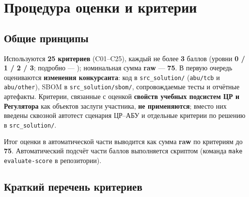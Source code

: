 \chapter{Процедура оценки и критерии}
\label{ch:evaluation}

\section{Общие принципы}

Используются \textbf{25 критериев} (C01--C25), каждый не более \textbf{3} баллов (уровни \textbf{0 / 1 / 2 / 3}; подробно --- ); номинальная сумма \textbf{raw} --- \textbf{75}. В первую очередь оцениваются \textbf{изменения конкурсанта}: код в \texttt{src\_solution/} (\texttt{abu/tcb} и \texttt{abu/other}), SBOM в \texttt{src\_solution/sbom/}, сопровождаемые тесты и отчётные артефакты. Критерии, связанные с оценкой \textbf{свойств учебных подсистем ЦР и Регулятора} как объектов заслуги участника, \textbf{не применяются}; вместо них введены сквозной автотест сценария ЦР--АБУ и отдельные критерии по решению в \texttt{src\_solution/}.

Итог оценки в автоматической части выводится как сумма \textbf{raw} по критериям до \textbf{75}. Автоматический подсчёт части баллов выполняется скриптом  (команда \texttt{make evaluate-score} в репозитории).

\section{Краткий перечень критериев}

